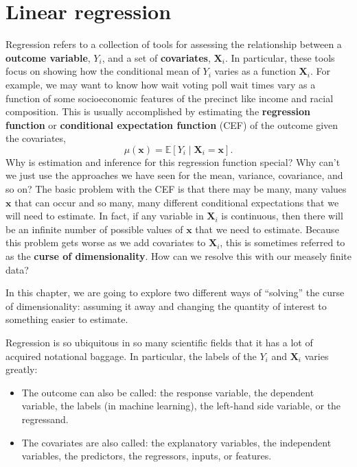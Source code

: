 \documentclass[
  letterpaper,
  DIV=11,
  numbers=noendperiod]{scrreprt}
\providecommand{\tightlist}{%
  \setlength{\itemsep}{0pt}\setlength{\parskip}{0pt}}\usepackage{longtable,booktabs,array}
\newcommand{\mb}{\symbf}
\newcommand{\E}{\mathbb{E}}
\newcommand{\X}{\mb{X}}
\newcommand{\bfx}{\mb{x}}
\theoremstyle{definition}
\theoremstyle{plain}
\theoremstyle{definition}
\theoremstyle{remark}
\begin{document}

\hypertarget{linear-regression}{%
\chapter{Linear regression}\label{linear-regression}}

Regression refers to a collection of tools for assessing the
relationship between a \textbf{outcome variable}, \(Y_i\), and a set of
\textbf{covariates}, \(\X_i\). In particular, these tools focus on
showing how the conditional mean of \(Y_i\) varies as a function
\(\X_i\). For example, we may want to know how wait voting poll wait
times vary as a function of some socioeconomic features of the precinct
like income and racial composition. This is usually accomplished by
estimating the \textbf{regression function} or \textbf{conditional
expectation function} (CEF) of the outcome given the covariates, \[
\mu(\bfx) = \E[Y_i \mid \X_i = \bfx].
\] Why is estimation and inference for this regression function special?
Why can't we just use the approaches we have seen for the mean,
variance, covariance, and so on? The basic problem with the CEF is that
there may be many, many values \(\bfx\) that can occur and so many, many
different conditional expectations that we will need to estimate. In
fact, if any variable in \(\X_i\) is continuous, then there will be an
infinite number of possible values of \(\bfx\) that we need to estimate.
Because this problem gets worse as we add covariates to \(\X_i\), this
is sometimes referred to as the \textbf{curse of dimensionality}. How
can we resolve this with our measely finite data?

In this chapter, we are going to explore two different ways of
``solving'' the curse of dimensionality: assuming it away and changing
the quantity of interest to something easier to estimate.

Regression is so ubiquitous in so many scientific fields that it has a
lot of acquired notational baggage. In particular, the labels of the
\(Y_i\) and \(\X_i\) varies greatly:

\begin{itemize}
\tightlist
\item
  The outcome can also be called: the response variable, the dependent
  variable, the labels (in machine learning), the left-hand side
  variable, or the regressand.
\item
  The covariates are also called: the explanatory variables, the
  independent variables, the predictors, the regressors, inputs, or
  features.
\end{itemize}
\end{document}

